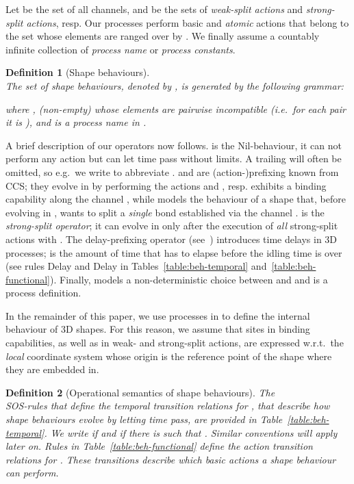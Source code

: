 \documentclass[11pt]{article}
\def\name#1{\mbox{\sc #1}}
\newtheorem{definition}{Definition}
\begin{document}
Let  be the set of all channels,  and  be the sets of {\em weak-split actions} and {\em strong-split actions}, resp. Our processes perform basic and {\em atomic} actions that belong to the set  whose elements are ranged over by . We finally assume a countably infinite collection  of {\em process name} or {\em process constants}.

\begin{definition}[Shape behaviours]
\ \\ The set of {\em shape behaviours}, denoted by  , is generated by the following grammar:

where ,  (non-empty) whose elements
are pairwise incompatible (i.e.\ for each pair  it is ),  and
 is a process name in .
\end{definition}

A brief description of our operators now follows.  is the Nil-behaviour, it can not perform any action but can let time pass without limits. A trailing  will often be omitted, so e.g.\ we write  to abbreviate .  and  are (action-)prefixing known from CCS; they evolve in  by performing the actions  and , resp.  exhibits a binding capability along the channel , while  models the behaviour of a shape that, before evolving in , wants to split a {\em single} bond established via the channel .
 is the {\em strong-split operator}; it can evolve in  only after the execution of
{\em all} strong-split actions  with .
The delay-prefixing operator  (see~\cite{Yi1990}) introduces time delays in 3D processes;  is the amount of time that has to elapse before the idling time is over (see rules \name{Delay} and \name{Delay} in Tables~\ref{table:beh-temporal} and~\ref{table:beh-functional}). Finally,  models a non-deterministic choice between  and  and  is a process definition.

In the remainder of this paper, we use processes in  to define the internal behaviour of
3D shapes. For this reason, we assume that sites in binding capabilities, as well as in weak- and
strong-split actions, are expressed w.r.t.\ the {\em local} coordinate system whose origin is
the reference point of the shape where they are embedded in.

\begin{definition}[Operational semantics of shape behaviours]
\label{def:behaviours-semantics}
The\\
\noindent SOS-rules that define the {\em temporal transition} relations  for , that describe how shape behaviours evolve by letting
time  pass, are provided in Table~\ref{table:beh-temporal}. We write  if
 and  if there is  such that .
Similar conventions will apply later on.
Rules in Table~\ref{table:beh-functional} define the {\em action transition} relations  for . These transitions describe which basic actions a
shape behaviour can perform.
\end{definition}
\end{document}
